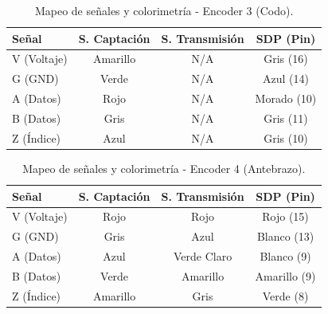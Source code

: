 \begin{table}[h]
	\centering
	\caption{Mapeo de señales y colorimetría - Encoder 3 (Codo).}
	\renewcommand{\arraystretch}{1.5}
	\begin{tabular}{lccc}
		\toprule
		\textbf{Señal} & \textbf{S. Captación} & \textbf{S. Transmisión} & \textbf{SDP (Pin)} \\ \midrule
		V (Voltaje)    & Amarillo              & N/A                     & Gris (16)          \\
		G (GND)        & Verde                 & N/A                     & Azul (14)          \\
		A (Datos)      & Rojo                  & N/A                     & Morado (10)        \\
		B (Datos)      & Gris                  & N/A                     & Gris (11)          \\
		Z (Índice)     & Azul                  & N/A                     & Gris (10)          \\ \bottomrule
	\end{tabular}
\end{table}

\begin{table}[h]
	\centering
	\caption{Mapeo de señales y colorimetría - Encoder 4 (Antebrazo).}
	\renewcommand{\arraystretch}{1.5}
	\begin{tabular}{lccc}
		\toprule
		\textbf{Señal} & \textbf{S. Captación} & \textbf{S. Transmisión} & \textbf{SDP (Pin)} \\ \midrule
		V (Voltaje)    & Rojo                  & Rojo                    & Rojo (15)          \\
		G (GND)        & Gris                  & Azul                    & Blanco (13)        \\
		A (Datos)      & Azul                  & Verde Claro             & Blanco (9)         \\
		B (Datos)      & Verde                 & Amarillo                & Amarillo (9)       \\
		Z (Índice)     & Amarillo              & Gris                    & Verde (8)          \\ \bottomrule
	\end{tabular}
\end{table}

